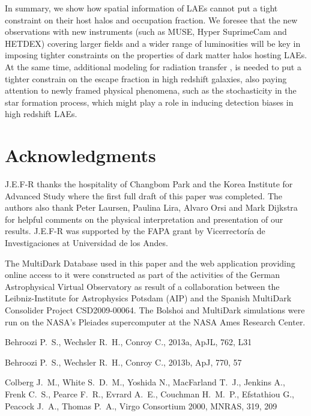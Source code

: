 \documentclass[usenatbib]{mn2e}
\newcommand{\apj}{ApJ}
\newcommand{\apjl}{ApJL}
\newcommand{\mnras}{MNRAS}
\newcommand{\ly}{{\ifmmode{{\rm Ly}\alpha}\else{Ly$\alpha$~}\fi}}
\begin{document}
{In summary, we show how spatial information of LAEs cannot
put a tight constraint on their host halos and occupation fraction. We
foresee that the new observations with new instruments (such as MUSE,
Hyper SuprimeCam and HETDEX) covering larger fields and a wider range
of luminosities will be key in imposing tighter constraints on the
properties of dark matter halos hosting LAEs. At the same time,
additional modeling for \ly radiation transfer , is needed to put a
tighter constrain on the \ly escape fraction in high redshift
galaxies, also paying attention to newly framed physical phenomena, such as the
stochasticity \citep{ForeroRomero2013} in the star formation process,
which might play a role in inducing detection biases in high redshift LAEs.


\section*{Acknowledgments} 
J.E.F-R thanks the hospitality of Changbom Park and the Korea
Institute for Advanced Study where the first full draft of this paper
was completed. The authors also thank Peter Laursen, Paulina Lira, 
Alvaro Orsi and Mark Dijkstra for helpful comments on the physical
interpretation and presentation of our results. J.E.F-R was
supported by the FAPA grant by Vicerrector\'ia de Investigaciones at
Universidad de los Andes.

The MultiDark Database used in this paper and the web application
providing online access to it were constructed as part of the
activities of the German Astrophysical Virtual Observatory as result
of a collaboration between the Leibniz-Institute for Astrophysics
Potsdam (AIP) and the Spanish MultiDark Consolider Project
CSD2009-00064. The Bolshoi and MultiDark simulations were run on the
NASA's Pleiades supercomputer at the NASA Ames Research Center.




\begin{thebibliography}{}

{Behroozi} P.~S.,  {Wechsler} R.~H.,    {Conroy} C.,  2013a, \apjl, 762, L31

{Behroozi} P.~S.,  {Wechsler} R.~H.,    {Conroy} C.,  2013b, \apj, 770, 57

{Colberg} J.~M.,  {White} S.~D.~M.,  {Yoshida} N.,  {MacFarland} T.~J.,
  {Jenkins} A.,  {Frenk} C.~S.,  {Pearce} F.~R.,  {Evrard} A.~E.,  {Couchman}
  H.~M.~P.,  {Efstathiou} G.,  {Peacock} J.~A.,  {Thomas} P.~A.,    {Virgo
  Consortium} 2000, \mnras, 319, 209


\end{thebibliography}}
\end{document}
